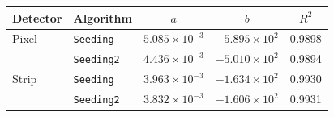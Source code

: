 \begin{tabular}{llccc}
    \toprule
    Detector & Algorithm & $a$ & $b$ & $R^{2}$ \\
    \midrule
    Pixel  & \texttt{Seeding} & $5.085\times10^{-3}$ & $-5.895\times10^{2}$ & 0.9898 \\
           & \texttt{Seeding2} & $4.436\times10^{-3}$ & $-5.010\times10^{2}$ & 0.9894 \\
    \midrule
    Strip  & \texttt{Seeding} & $3.963\times10^{-3}$ & $-1.634\times10^{2}$ & 0.9930 \\
           & \texttt{Seeding2} & $3.832\times10^{-3}$ & $-1.606\times10^{2}$ & 0.9931 \\
    \bottomrule
\end{tabular}
